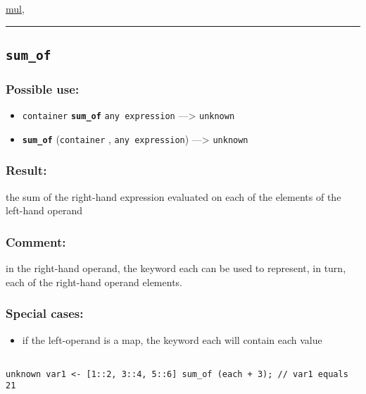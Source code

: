 \documentclass[]{book}
\providecommand{\tightlist}{%
  \setlength{\itemsep}{0pt}\setlength{\parskip}{0pt}}
\theoremstyle{definition}
\theoremstyle{definition}
\theoremstyle{definition}
\theoremstyle{remark}
\begin{document}
\href{operators-i-to-m.html\#mul}{mul},

\begin{center}\rule{0.5\linewidth}{\linethickness}\end{center}

\subsection{\texorpdfstring{\texttt{sum\_of}}{sum\_of}}\label{sum_of}

\subsubsection{Possible use:}\label{possible-use-510}

\begin{itemize}
\tightlist
\item
  \texttt{container} \textbf{\texttt{sum\_of}} \texttt{any\ expression}
  ---\textgreater{} \texttt{unknown}
\item
  \textbf{\texttt{sum\_of}} (\texttt{container} ,
  \texttt{any\ expression}) ---\textgreater{} \texttt{unknown}
\end{itemize}

\subsubsection{Result:}\label{result-493}

the sum of the right-hand expression evaluated on each of the elements
of the left-hand operand

\subsubsection{Comment:}\label{comment-97}

in the right-hand operand, the keyword each can be used to represent, in
turn, each of the right-hand operand elements.

\subsubsection{Special cases:}\label{special-cases-133}

\begin{itemize}
\tightlist
\item
  if the left-operand is a map, the keyword each will contain each value
\end{itemize}

\begin{verbatim}
 
unknown var1 <- [1::2, 3::4, 5::6] sum_of (each + 3); // var1 equals 21
\end{verbatim}
\end{document}
